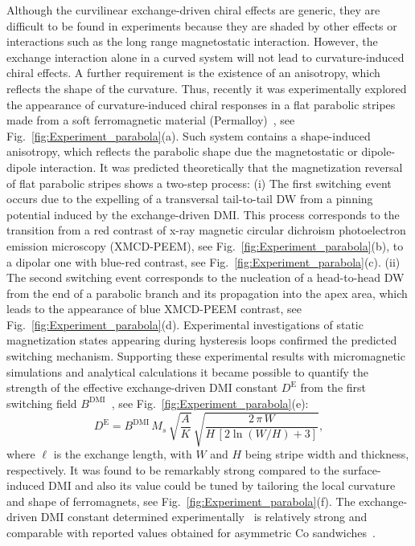 Although the curvilinear exchange-driven chiral effects are generic, they are difficult to be found in experiments because they are shaded by other effects or interactions such as the long range magnetostatic interaction. However, the exchange interaction alone in a curved system will not lead to curvature-induced chiral effects. A further requirement is the existence of an anisotropy, which reflects the shape of the curvature. Thus, recently it was experimentally explored the appearance of curvature-induced chiral responses in a flat parabolic stripes made from a soft ferromagnetic material (Permalloy)~\cite{Volkov19c}, see Fig.~\ref{fig:Experiment_parabola}(a). Such system contains a shape-induced anisotropy, which reflects the parabolic shape due the magnetostatic or dipole-dipole interaction. It was predicted theoretically that the magnetization reversal of flat parabolic stripes shows a two-step process: (i) The first switching event occurs due to the expelling of a transversal tail-to-tail DW from a pinning potential induced by the exchange-driven DMI. This process corresponds to the transition from a red contrast of x-ray magnetic circular dichroism photoelectron emission microscopy (XMCD-PEEM), see Fig.~\ref{fig:Experiment_parabola}(b), to a dipolar one with blue-red contrast, see Fig.~\ref{fig:Experiment_parabola}(c). (ii) The second switching event corresponds to the nucleation of a head-to-head DW from the end of a parabolic branch and its propagation into the apex area, which leads to the appearance of blue XMCD-PEEM contrast, see Fig.~\ref{fig:Experiment_parabola}(d). Experimental investigations of static magnetization states appearing during hysteresis loops confirmed the predicted switching mechanism. Supporting these experimental results with micromagnetic simulations and analytical calculations it became possible to quantify the strength of the effective exchange-driven DMI constant $D^\mathrm{E}$ from the first switching field $B^\textrm{DMI}$~\cite{Volkov19c}, see Fig.~\ref{fig:Experiment_parabola}(e): 
\begin{equation} \label{eq:experimental_DMI_coef}
D^\textrm{E} = B^\textrm{DMI} \, M_s \, \sqrt{\frac{A}{K}} \, \sqrt{\dfrac{2 \, \pi \, W}{H \, \left[ 2 \ln(W/H)+3 \right]}},
\end{equation}   
where $\ell$ is the exchange length, with $W$ and $H$ being stripe width and thickness, respectively. It was found to be remarkably strong compared to the surface-induced DMI and also its value could be tuned by tailoring the local curvature and shape of ferromagnets, see Fig.~\ref{fig:Experiment_parabola}(f). The exchange-driven DMI constant determined experimentally~\cite{Volkov19c} is relatively strong and comparable with reported values obtained for asymmetric Co sandwiches~\cite{Boulle16}.
